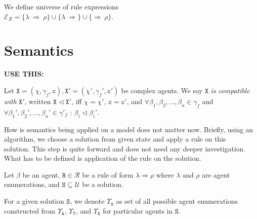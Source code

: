 \documentclass{entcs}
\renewcommand{\~}[0]{\texttildelow}
\begin{document}
\begin{theorem}
We define universe of rule expressions\\ $\mathcal{E}_\mathcal{R} = \{ \lambda ~\Rightarrow~ \rho \} \cup \{ \lambda ~\Rightarrow  \} \cup \{ \Rightarrow~ \rho \}$.
\end{theorem}

\section{Semantics}

\textbf{USE THIS:}

\begin{defn}
Let $\mathtt{X} = (\chi, \gamma_f, \mathtt{c}), \mathtt{X}' = (\chi', \gamma_f', \mathtt{c}')$ be complex agents. We say $\mathtt{X}$ \emph{is compatible with} $\mathtt{X}'$, written $\mathtt{X} \lhd \mathtt{X}'$, iff $\chi=\chi'$, $\mathtt{c} = \mathtt{c}'$, and $\forall \beta_1, \beta_2, ..., \beta_n \in \gamma_f $ and $\forall \beta_1', \beta_2', ..., \beta_n' \in \gamma'_f$ : $\beta_i \lhd \beta_i'$. 
\end{defn}

How is semantics being applied on a model does not matter now. Briefly, using an algorithm, we choose a solution from given state and apply a rule on this solution. This step is quite forward and does not need any deeper investigation. What has to be defined is application of the rule on the solution.

Let $\beta$ be an agent, $\mathtt{R} \in \mathcal{R}$ be a rule of form $\lambda \Rightarrow \rho$ where $\lambda$ and $\rho$ are agent enumerations, and $\mathtt{S} \subseteq \mathcal{U}$ be a solution. 

\begin{definition}
For a given solution $\mathtt{S}$, we denote $\Upsilon_\mathtt{S}$ as set of all possible agent enumerations constructed from $\Upsilon_\mathtt{A}$, $\Upsilon_\mathtt{T}$, and $\Upsilon_\mathtt{X}$ for particular agents in $\mathtt{S}$.
\end{definition}
\end{document}
